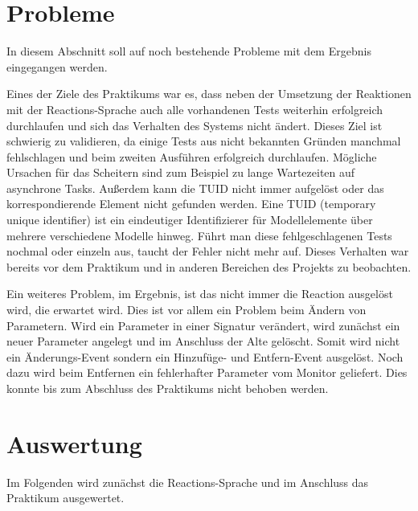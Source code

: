 \documentclass[ngerman,runningheads]{llncs}
\begin{document}
\section{Probleme}
\label{sec:probleme}
In diesem Abschnitt soll auf noch bestehende Probleme mit dem Ergebnis eingegangen werden. \par
Eines der Ziele des Praktikums war es, dass neben der Umsetzung der Reaktionen mit der Reactions-Sprache auch alle vorhandenen Tests weiterhin erfolgreich durchlaufen und sich das Verhalten des Systems nicht ändert. Dieses Ziel ist schwierig zu validieren, da einige Tests aus nicht bekannten Gründen manchmal fehlschlagen und beim zweiten Ausführen erfolgreich durchlaufen. Mögliche Ursachen für das Scheitern sind zum Beispiel zu lange Wartezeiten auf asynchrone Tasks. Außerdem kann die TUID nicht immer aufgelöst oder das korrespondierende Element nicht gefunden werden. Eine TUID (temporary unique identifier) ist ein eindeutiger Identifizierer für Modellelemente über mehrere verschiedene Modelle hinweg. Führt man diese fehlgeschlagenen Tests nochmal oder einzeln aus, taucht der Fehler nicht mehr auf. Dieses Verhalten war bereits vor dem Praktikum und in anderen Bereichen des Projekts zu beobachten. \par
Ein weiteres Problem, im Ergebnis, ist das nicht immer die Reaction ausgelöst wird, die erwartet wird. Dies ist vor allem ein Problem beim Ändern von Parametern. Wird ein Parameter in einer Signatur verändert, wird zunächst ein neuer Parameter angelegt und im Anschluss der Alte gelöscht. Somit wird nicht ein Änderungs-Event sondern ein Hinzufüge- und Entfern-Event ausgelöst. Noch dazu wird beim Entfernen ein fehlerhafter Parameter vom Monitor geliefert. Dies konnte bis zum Abschluss des Praktikums nicht behoben werden.
\section{Auswertung}
\label{sec:auswertung}
Im Folgenden wird zunächst die Reactions-Sprache und im Anschluss das Praktikum ausgewertet.\par
\end{document}
